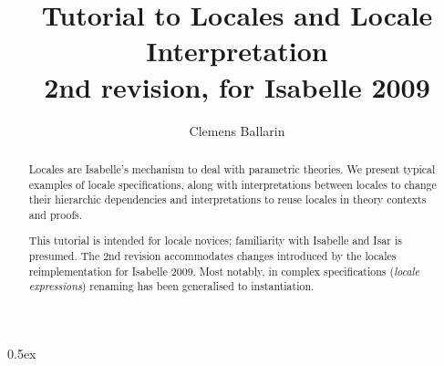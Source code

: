 \documentclass[11pt,a4paper]{article}
\begin{document}
\title{Tutorial to Locales and Locale Interpretation \\[1ex]
  \large 2nd revision, for Isabelle 2009}
\author{Clemens Ballarin}
\date{}

\maketitle

\thispagestyle{myheadings}

\begin{abstract}
  Locales are Isabelle's mechanism to deal with parametric theories.
  We present typical examples of locale specifications,
  along with interpretations between locales to change their
  hierarchic dependencies and interpretations to reuse locales in
  theory contexts and proofs.

  This tutorial is intended for locale novices; familiarity with
  Isabelle and Isar is presumed.
  The 2nd revision accommodates changes introduced by the locales
  reimplementation for Isabelle 2009.  Most notably, in complex
  specifications (\emph{locale expressions}) renaming has been
  generalised to instantiation.
\end{abstract}

\parindent 0pt\parskip 0.5ex



\newpage


\end{document}
